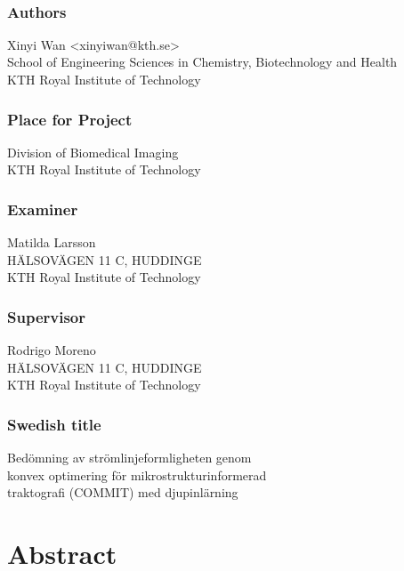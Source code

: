 \newpage
\thispagestyle{plain}
~\\
\vfill
{ 
	\subsection*{Authors}
	Xinyi Wan <xinyiwan@kth.se>\\
	School of Engineering Sciences in Chemistry, Biotechnology and Health\\
	KTH Royal Institute of Technology
	
	\subsection*{Place for Project}
	Division of Biomedical Imaging\\
	KTH Royal Institute of Technology
	
	\subsection*{Examiner}
	Matilda Larsson\\
	HÄLSOVÄGEN 11 C, HUDDINGE \\
	KTH Royal Institute of Technology
	
	\subsection*{Supervisor}
	Rodrigo Moreno\\
	HÄLSOVÄGEN 11 C, HUDDINGE\\
	KTH Royal Institute of Technology

	\subsection*{Swedish title}
	Bedömning av strömlinjeformligheten genom\\
	konvex optimering för mikrostrukturinformerad \\
	traktografi (COMMIT) med djupinlärning
	~
}


\newpage
\thispagestyle{plain}
\chapter*{Abstract}

